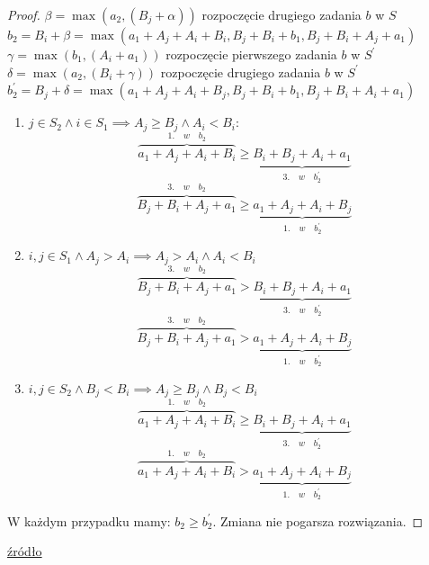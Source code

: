 \documentclass{article}
\begin{document}
\begin{proof}
$\beta = \max(a_2, (B_j + \alpha))$ rozpoczęcie drugiego zadania $b$ w $S$\\
$b_2 = B_i + \beta = \max(a_1+A_j+A_i+B_i, B_j + B_i +b_1, B_j+B_i +A_j+a_1)$\\
$\gamma = \max(b_1,(A_i+a_1))$ rozpoczęcie pierwszego zadania $b$ w $S^\prime$\\
$\delta = \max(a_2,(B_i+\gamma))$ rozpoczęcie drugiego zadania $b$ w $S^\prime$\\
$b_2^\prime = B_j + \delta = \max(a_1+A_j+A_i+B_j, B_j + B_i +b_1, B_j+B_i +A_i+a_1)$\\
\clearpage
\begin{enumerate}
    \item $j \in S_2 \land i \in S_1 \implies A_j \geq B_j \land A_i < B_i$:
    $$
    \overbrace{a_1 + A_j + A_i + B_i}^{1. \quad w \quad b_2} \geq \underbrace{B_i + B_j + A_i + a_1}_{3. \quad w \quad b_2^\prime}
    $$
    $$
    \overbrace{B_j + B_i + A_j + a_1}^{3. \quad w \quad b_2} \geq \underbrace{a_1 + A_j + A_i + B_j}_{1. \quad w \quad b_2^\prime}
    $$
    \item $i,j \in S_1 \land A_j > A_i \implies A_j > A_i \land A_i < B_i$
    $$
    \overbrace{B_j + B_i + A_j + a_1}^{3. \quad w \quad b_2} > \underbrace{B_i + B_j + A_i + a_1}_{3. \quad w \quad b_2^\prime}
    $$
    $$
    \overbrace{B_j + B_i + A_j + a_1}^{3. \quad w \quad b_2} > \underbrace{a_1 + A_j + A_i + B_j}_{1. \quad w \quad b_2^\prime}
    $$
    \item $i,j \in S_2 \land B_j < B_i \implies A_j \geq B_j \land B_j < B_i$
    $$
    \overbrace{a_1 + A_j + A_i + B_i}^{1. \quad w \quad b_2} \geq \underbrace{B_i + B_j + A_i + a_1}_{3. \quad w \quad b_2^\prime}
    $$
    $$
    \overbrace{a_1 + A_j + A_i + B_i}^{1. \quad w \quad b_2} > \underbrace{a_1 + A_j + A_i + B_j}_{1. \quad w \quad b_2^\prime}
    $$
\end{enumerate}
W każdym przypadku mamy: $b_2 \geq b_2^\prime$. Zmiana nie pogarsza rozwiązania.
\end{proof}
\href{https://personal.utdallas.edu/~chandra/documents/6363/lec7.pdf}{źródło}
\clearpage
\setcounter{lemma}{0}
\end{document}
